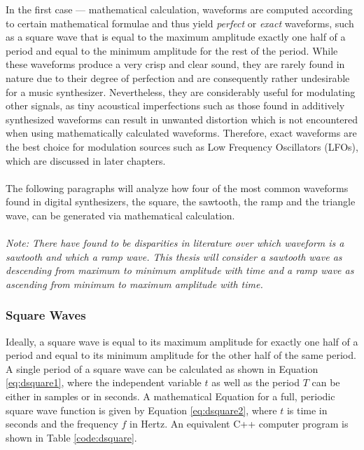 \documentclass[12pt,twoside]{report}
\begin{document}
In the first case --- mathematical calculation, waveforms are computed according to certain mathematical formulae and thus yield \emph{perfect} or \emph{exact} waveforms, such as a square wave that is equal to the maximum amplitude exactly one half of a period and equal to the minimum amplitude for the rest of the period. While these waveforms produce a very crisp and clear sound, they are rarely found in nature due to their degree of perfection and are consequently rather undesirable for a music synthesizer. Nevertheless, they are considerably useful for modulating other signals, as tiny acoustical imperfections such as those found in additively synthesized waveforms can result in unwanted distortion which is not encountered when using mathematically calculated waveforms. Therefore, exact waveforms are the best choice for modulation sources such as Low Frequency Oscillators (LFOs), which are discussed in later chapters. \\\\
The following paragraphs will analyze how four of the most common waveforms found in digital synthesizers, the square, the sawtooth, the ramp and the triangle wave, can be generated via mathematical calculation.\\\\
\emph{Note: There have found to be disparities in literature over which waveform is a sawtooth and which a ramp wave. This thesis will consider a sawtooth wave as descending from maximum to minimum amplitude with time and a ramp wave as ascending from minimum to maximum amplitude with time.}

\subsubsection{Square Waves}

Ideally, a square wave is equal to its maximum amplitude for exactly one half of a period and equal to its minimum amplitude for the other half of the same period. A single period of a square wave can be calculated as shown in Equation \ref{eq:dsquare1}, where the independent variable $t$ as well as the period $T$ can be either in samples or in seconds. A mathematical Equation for a full, periodic square wave function is given by Equation \ref{eq:dsquare2}, where $t$ is time in seconds and the frequency $f$ in Hertz. An equivalent C++ computer program is shown in Table \ref{code:dsquare}.
\end{document}
